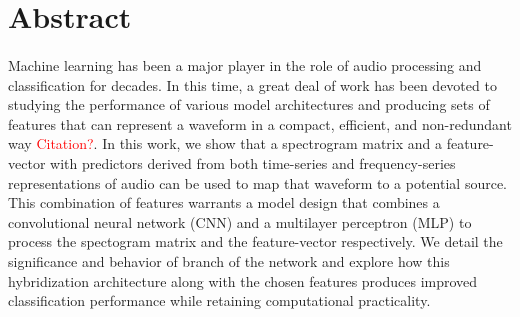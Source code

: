 \documentclass[12pt,letterpaper]{article}
\begin{document}

\section{Abstract}

\paragraph*{}Machine learning has been a major player in the role of audio processing and classification for decades. In this time, a great deal of work has been devoted to studying the performance of various model architectures and producing sets of features that can represent a waveform in a compact, efficient, and non-redundant way \textcolor{red}{Citation?}. In this work, we show that a spectrogram matrix and a feature-vector with predictors derived from both time-series and frequency-series representations of audio can be used to map that waveform to a potential source. This combination of features warrants a model design that combines a convolutional neural network (CNN) and a multilayer perceptron (MLP) to process the spectogram matrix and the feature-vector respectively. We detail the significance and behavior of branch of the network and explore how this hybridization architecture along with the chosen features produces improved classification performance while retaining computational practicality.

\end{document}
